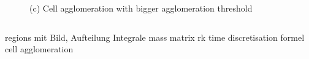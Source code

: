 \begin{frame}
\begin{columns}[t]
\begin{figure}[htbp]
				\caption*{(c) Cell agglomeration with bigger agglomeration threshold}
				\label{fig:iwnit}
			\end{figure} 
		\end{columns}
		regions mit Bild, Aufteilung Integrale
		mass matrix
		rk time discretisation formel
		cell agglomeration
	\end{frame}